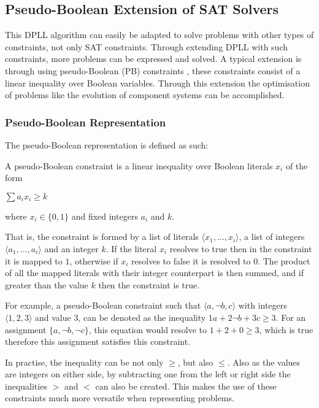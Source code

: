 \subsection{Pseudo-Boolean Extension of SAT Solvers}
This DPLL algorithm can easily be adapted to solve problems with other types of constraints, not only SAT constraints.
Through extending DPLL with such constraints, more problems can be expressed and solved.
A typical extension is through using pseudo-Boolean (PB) constraints \citep{dixon2004automating}, these constraints consist of a linear inequality over Boolean variables.
Through this extension the optimisation of problems like the evolution of component systems can be accomplished.

\subsubsection{Pseudo-Boolean Representation}
The pseudo-Boolean representation is defined as such:

\begin{defs}
A pseudo-Boolean constraint is a linear inequality over Boolean literals $x_i$ of the form

$\sum a_i x_i \geq k$

where $x_i \in \{0,1\}$ and fixed integers $a_i$ and $k$.
\end{defs}

That is, the constraint is formed by a list of literals $\langle x_1,\ldots,x_i \rangle$, a list of integers $\langle a_1,\ldots,a_i \rangle$ and an integer $k$.
If the literal $x_i$ resolves to true then in the constraint it is mapped to $1$, otherwise  if $x_i$ resolves to false it is resolved to $0$.
The product of all the mapped literals with their integer counterpart is then summed, and if greater than the value $k$ then the constraint is true. 

For example, a pseudo-Boolean constraint such that $\langle a, \neg b , c\rangle$ with integers $\langle 1, 2, 3\rangle$ and value $3$,
can be denoted as the inequality $1a + 2 \neg b + 3c \geq 3$.
For an assignment $\{a , \neg b, \neg c\}$, this equation would resolve to $1 + 2 + 0 \geq 3$, which is true therefore this assignment satisfies this constraint.

In practise, the inequality can be not only $\geq$, but also $\leq$.
Also as the values are integers on either side, by subtracting one from the left or right side the inequalities $>$ and $<$ can also be created.
This makes the use of these constraints much more versatile when representing problems.

